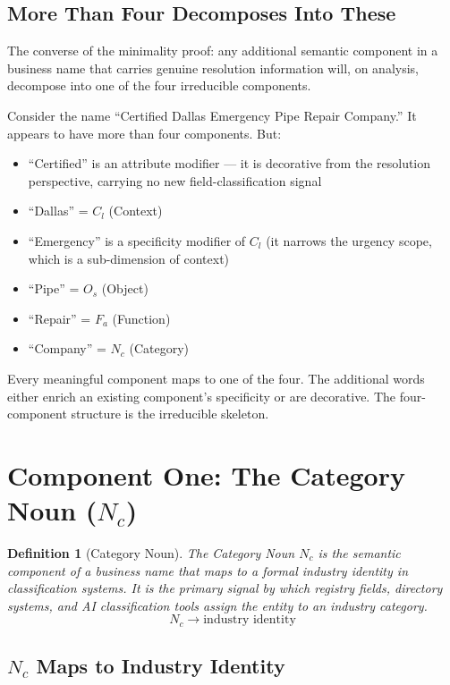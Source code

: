 \documentclass[12pt, openany]{book}
\theoremstyle{thmstyle}
\theoremstyle{defstyle}
\newtheorem{definition}{Definition}[chapter]
\newcommand{\Nc}{N_c}
\newcommand{\Os}{O_s}
\newcommand{\Fa}{F_a}
\newcommand{\Cl}{C_l}
\begin{document}
\subsection{More Than Four Decomposes Into These}

The converse of the minimality proof: any additional semantic component in a business name that carries genuine resolution information will, on analysis, decompose into one of the four irreducible components.

Consider the name ``Certified Dallas Emergency Pipe Repair Company.'' It appears to have more than four components. But:
\begin{itemize}[leftmargin=1.5em]
  \item ``Certified'' is an attribute modifier --- it is decorative from the resolution perspective, carrying no new field-classification signal
  \item ``Dallas'' = $\Cl$ (Context)
  \item ``Emergency'' is a specificity modifier of $\Cl$ (it narrows the urgency scope, which is a sub-dimension of context)
  \item ``Pipe'' = $\Os$ (Object)
  \item ``Repair'' = $\Fa$ (Function)
  \item ``Company'' = $\Nc$ (Category)
\end{itemize}

Every meaningful component maps to one of the four. The additional words either enrich an existing component's specificity or are decorative. The four-component structure is the irreducible skeleton.

\section{Component One: The Category Noun ($N_c$)}

\begin{definition}[Category Noun]
The Category Noun $\Nc$ is the semantic component of a business name that maps to a formal industry identity in classification systems. It is the primary signal by which registry fields, directory systems, and AI classification tools assign the entity to an industry category.
\[
\Nc \rightarrow \text{industry identity}
\]
\end{definition}

\subsection{$N_c$ Maps to Industry Identity}
\end{document}
